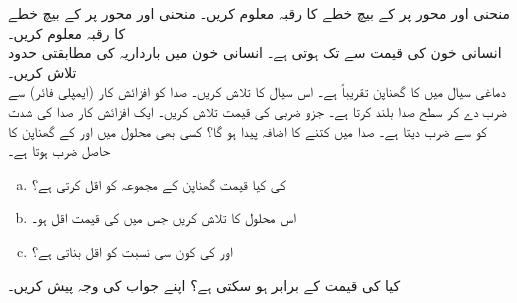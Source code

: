 منحنی  اور محور  پر   کے بیچ خطے کا رقبہ معلوم کریں۔
منحنی  اور محور  پر   کے بیچ خطے کا رقبہ معلوم کریں۔
\\
انسانی خون کی    قیمت  سے  تک ہوتی ہے۔ انسانی خون میں بارداریہ  کی مطابقتی حدود تلاش کریں۔ 
\wf{\unexpanded{
$[10^{-7.44},10^{-7.37}]$
}}
\\
دماغی سیال میں  کا گھناپن تقریباً  ہے۔ اس سیال کا تلاش کریں۔
صدا کو افزائش کار (ایمپلی فائر)   سے ضرب دے کر  سطح صدا     بلند   کرتا ہے۔ جزو  ضربی  کی قیمت تلاش کریں۔
ایک افزائش کار صدا کی شدت کو  سے ضرب دیتا ہے۔ صدا میں کتنے  کا اضافہ پیدا ہو گا؟ 
کسی بھی محلول میں   اور  کے گھناپن کا حاصل ضرب  ہوتا ہے۔
\begin{enumerate}[a.]
\item
{} کی کیا قیمت گھناپن کے مجموعہ  کو اقل  کرتی ہے؟
\item
اس محلول کا   تلاش کریں  جس میں  کی قیمت اقل ہو۔
\item
{} اور  کی کون سی نسبت  کو اقل بناتی ہے؟
\end{enumerate}
کیا  کی قیمت  کے برابر ہو سکتی ہے؟ اپنے جواب کی وجہ   پیش کریں۔

